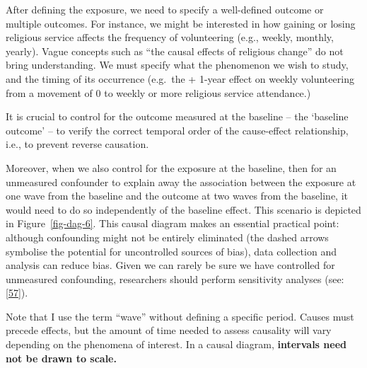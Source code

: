 \documentclass[
  singlecolumn]{article}
\begin{document}
After defining the exposure, we need to specify a well-defined outcome
or multiple outcomes. For instance, we might be interested in how
gaining or losing religious service affects the frequency of
volunteering (e.g., weekly, monthly, yearly). Vague concepts such as
``the causal effects of religious change'' do not bring understanding.
We must specify what the phenomenon we wish to study, and the timing of
its occurrence (e.g.~the + 1-year effect on weekly volunteering from a
movement of 0 to weekly or more religious service attendance.)

It is crucial to control for the outcome measured at the baseline -- the
`baseline outcome' -- to verify the correct temporal order of the
cause-effect relationship, i.e., to prevent reverse causation.

Moreover, when we also control for the exposure at the baseline, then
for an unmeasured confounder to explain away the association between the
exposure at one wave from the baseline and the outcome at two waves from
the baseline, it would need to do so independently of the baseline
effect. This scenario is depicted in Figure~\ref{fig-dag-6}. This causal
diagram makes an essential practical point: although confounding might
not be entirely eliminated (the dashed arrows symbolise the potential
for uncontrolled sources of bias), data collection and analysis can
reduce bias. Given we can rarely be sure we have controlled for
unmeasured confounding, researchers should perform sensitivity analyses
(see: {[}\protect\hyperlink{ref-shi2021}{57}{]}).

Note that I use the term ``wave'' without defining a specific period.
Causes must precede effects, but the amount of time needed to assess
causality will vary depending on the phenomena of interest. In a causal
diagram, \textbf{intervals need not be drawn to scale.}
\end{document}
